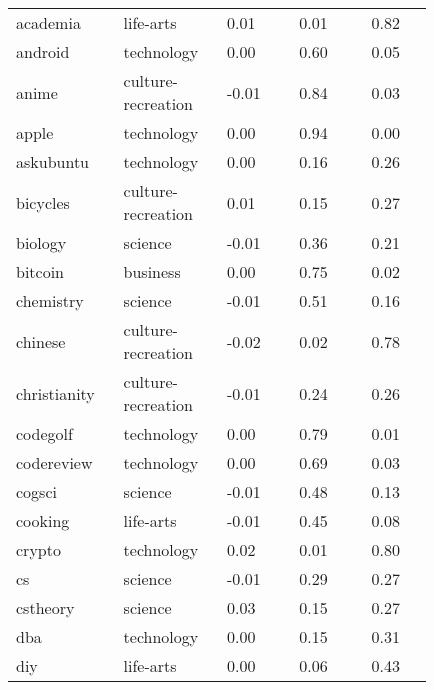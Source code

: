 \begin{longtabu}{@{}
	p{0.2\linewidth}
	p{0.2\linewidth}
	P{0.15\linewidth}
	P{0.15\linewidth}
	P{0.13\linewidth}@{}}
\\
\endlastfoot
academia         & life-arts          & 0.01        & 0.01          & 0.82           \\
android          & technology         & 0.00        & 0.60          & 0.05           \\
anime            & culture-recreation & -0.01       & 0.84          & 0.03           \\
apple            & technology         & 0.00        & 0.94          & 0.00           \\
askubuntu        & technology         & 0.00        & 0.16          & 0.26           \\
bicycles         & culture-recreation & 0.01        & 0.15          & 0.27           \\
biology          & science            & -0.01       & 0.36          & 0.21           \\
bitcoin          & business           & 0.00        & 0.75          & 0.02           \\
chemistry        & science            & -0.01       & 0.51          & 0.16           \\
chinese          & culture-recreation & -0.02       & 0.02          & 0.78           \\
christianity     & culture-recreation & -0.01       & 0.24          & 0.26           \\
codegolf         & technology         & 0.00        & 0.79          & 0.01           \\
codereview       & technology         & 0.00        & 0.69          & 0.03           \\
cogsci           & science            & -0.01       & 0.48          & 0.13           \\
cooking          & life-arts          & -0.01       & 0.45          & 0.08           \\
crypto           & technology         & 0.02        & 0.01          & 0.80           \\
cs               & science            & -0.01       & 0.29          & 0.27           \\
cstheory         & science            & 0.03        & 0.15          & 0.27           \\
dba              & technology         & 0.00        & 0.15          & 0.31           \\
diy              & life-arts          & 0.00        & 0.06          & 0.43           \\

\end{longtabu}
